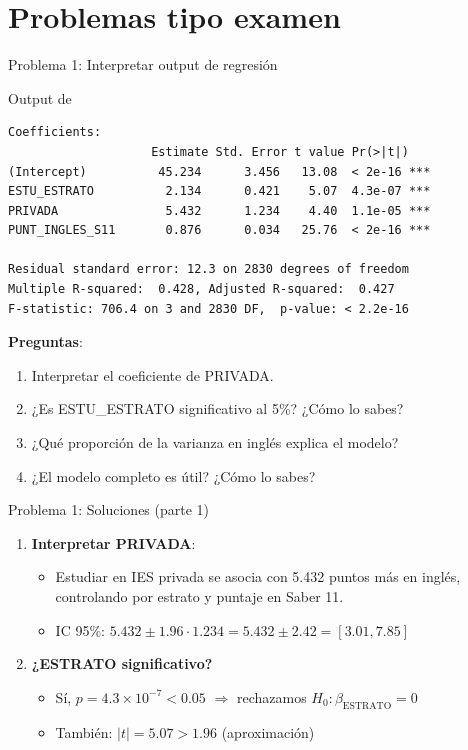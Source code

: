 \documentclass[aspectratio=169, 11pt]{beamer}
\begin{document}
\section{Problemas tipo examen}

\begin{frame}[fragile]{Problema 1: Interpretar output de regresión}
\begin{exampleblock}{Output de }
\tiny
\begin{verbatim}
Coefficients:
                    Estimate Std. Error t value Pr(>|t|)
(Intercept)          45.234      3.456   13.08  < 2e-16 ***
ESTU_ESTRATO          2.134      0.421    5.07  4.3e-07 ***
PRIVADA               5.432      1.234    4.40  1.1e-05 ***
PUNT_INGLES_S11       0.876      0.034   25.76  < 2e-16 ***

Residual standard error: 12.3 on 2830 degrees of freedom
Multiple R-squared:  0.428,	Adjusted R-squared:  0.427
F-statistic: 706.4 on 3 and 2830 DF,  p-value: < 2.2e-16
\end{verbatim}
\end{exampleblock}

\textbf{Preguntas}:
\begin{enumerate}
\item Interpretar el coeficiente de PRIVADA.
\item ¿Es ESTU\_ESTRATO significativo al 5\%? ¿Cómo lo sabes?
\item ¿Qué proporción de la varianza en inglés explica el modelo?
\item ¿El modelo completo es útil? ¿Cómo lo sabes?
\end{enumerate}
\end{frame}

\begin{frame}{Problema 1: Soluciones (parte 1)}
\begin{enumerate}
\item \textbf{Interpretar PRIVADA}:
  \begin{itemize}
  \item Estudiar en IES privada se asocia con 5.432 puntos más en inglés, controlando por estrato y puntaje en Saber 11.
  \item IC 95\%: $5.432 \pm 1.96 \cdot 1.234 = 5.432 \pm 2.42 = [3.01, 7.85]$
  \end{itemize}

\item \textbf{¿ESTRATO significativo?}
  \begin{itemize}
  \item Sí, $p = 4.3 \times 10^{-7} < 0.05$ $\Rightarrow$ rechazamos $H_0: \beta_{\text{ESTRATO}} = 0$
  \item También: $|t| = 5.07 > 1.96$ (aproximación)
  \end{itemize}
\end{enumerate}
\end{frame}
\end{document}
